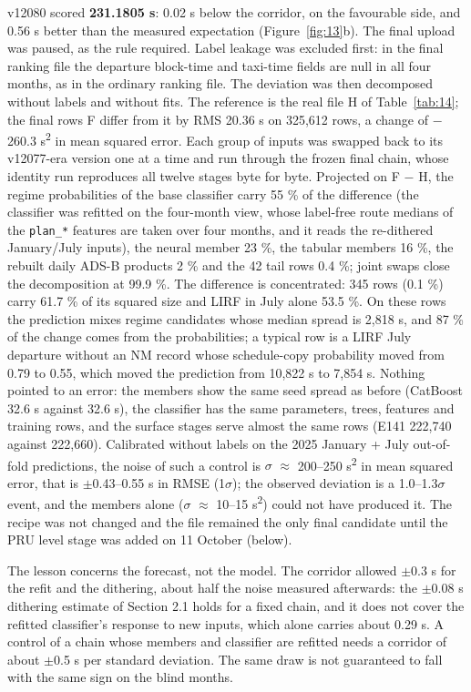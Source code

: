 \documentclass[
  manuscript=article,  %
  layout=preprint,     %
  year=2026,
  volume=4,
]{extra/joas}
\begin{document}
v12080 scored \textbf{231.1805 s}: 0.02 s below the corridor, on the favourable side, and 0.56 s better than the measured expectation (Figure~\ref{fig:13}b). The final upload was paused, as the rule required. Label leakage was excluded first: in the final ranking file the departure block-time and taxi-time fields are null in all four months, as in the ordinary ranking file. The deviation was then decomposed without labels and without fits. The reference is the real file H of Table~\ref{tab:14}; the final rows F differ from it by RMS 20.36 s on 325,612 rows, a change of $-$260.3 s\textsuperscript{2} in mean squared error. Each group of inputs was swapped back to its v12077-era version one at a time and run through the frozen final chain, whose identity run reproduces all twelve stages byte for byte. Projected on F $-$ H, the regime probabilities of the base classifier carry 55 \% of the difference (the classifier was refitted on the four-month view, whose label-free route medians of the \texttt{plan\_\allowbreak{}*} features are taken over four months, and it reads the re-dithered January/July inputs), the neural member 23 \%, the tabular members 16 \%, the rebuilt daily ADS-B products 2 \% and the 42 tail rows 0.4 \%; joint swaps close the decomposition at 99.9 \%. The difference is concentrated: 345 rows (0.1 \%) carry 61.7 \% of its squared size and LIRF in July alone 53.5 \%. On these rows the prediction mixes regime candidates whose median spread is 2,818 s, and 87 \% of the change comes from the probabilities; a typical row is a LIRF July departure without an NM record whose schedule-copy probability moved from 0.79 to 0.55, which moved the prediction from 10,822 s to 7,854 s. Nothing pointed to an error: the members show the same seed spread as before (CatBoost 32.6 s against 32.6 s), the classifier has the same parameters, trees, features and training rows, and the surface stages serve almost the same rows (E141 222,740 against 222,660). Calibrated without labels on the 2025 January + July out-of-fold predictions, the noise of such a control is $\sigma$ $\approx$ 200--250 s\textsuperscript{2} in mean squared error, that is $\pm$0.43--0.55 s in RMSE (1$\sigma$); the observed deviation is a 1.0--1.3$\sigma$ event, and the members alone ($\sigma$ $\approx$ 10--15 s\textsuperscript{2}) could not have produced it. The recipe was not changed and the file remained the only final candidate until the PRU level stage was added on 11 October (below).

The lesson concerns the forecast, not the model. The corridor allowed $\pm$0.3 s for the refit and the dithering, about half the noise measured afterwards: the $\pm$0.08 s dithering estimate of Section 2.1 holds for a fixed chain, and it does not cover the refitted classifier's response to new inputs, which alone carries about 0.29 s. A control of a chain whose members and classifier are refitted needs a corridor of about $\pm$0.5 s per standard deviation. The same draw is not guaranteed to fall with the same sign on the blind months.
\end{document}

